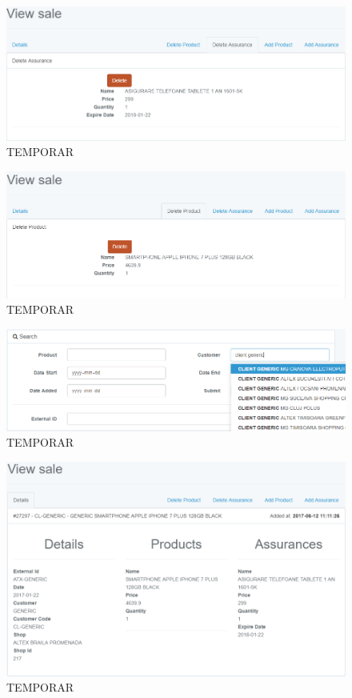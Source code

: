 	\begin{figure}
		\includegraphics[width=\linewidth]{../imagini/sales_delete_assurance.png}
		\caption{TEMPORAR}
		\label{fig:TEMP}
	\end{figure}
	\begin{figure}
		\includegraphics[width=\linewidth]{../imagini/sales_delete_product.png}
		\caption{TEMPORAR}
		\label{fig:TEMP}
	\end{figure}
	\begin{figure}
		\includegraphics[width=\linewidth]{../imagini/sales_search.png}
		\caption{TEMPORAR}
		\label{fig:TEMP}
	\end{figure}
	\begin{figure}
		\includegraphics[width=\linewidth]{../imagini/sales_view.png}
		\caption{TEMPORAR}
		\label{fig:TEMP}
	\end{figure}
